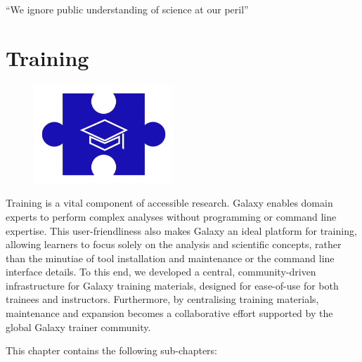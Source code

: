 \cleartorightpage
\begin{savequote}[75mm]
``We ignore public understanding of science at our peril''
\end{savequote}

\chapter{Training}\label{chapter:training}

\begin{figure}[t!]
\includegraphics[height=10em]{frontmatter/images/chapter-header-training.png}
\end{figure}
\setcounter{figure}{-1}
\setcounter{table}{-1}
\setcounter{section}{-1}

Training is a vital component of accessible research. Galaxy enables domain experts to perform complex analyses without programming or command line expertise. This user-friendliness also makes Galaxy an ideal platform for training, allowing learners to focus solely on the analysis and scientific concepts, rather than the minutiae of tool installation and maintenance or the command line interface details. To this end, we developed a central, community-driven infrastructure for Galaxy training materials, designed for ease-of-use for both trainees and instructors. Furthermore, by centralising training materials, maintenance and expansion becomes a collaborative effort supported by the global Galaxy trainer community.

This chapter contains the following sub-chapters:

